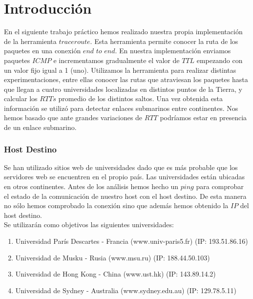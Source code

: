 \section{Introducción}

En el siguiente trabajo práctico hemos realizado nuestra propia implementación de la herramienta $traceroute$.
Esta herramienta permite conocer la ruta de los paquetes en una conexión $end$ $to$ $end$. 
En nuestra implementación enviamos paquetes $ICMP$ e incrementamos gradualmente el valor de $TTL$ empezando con un valor fijo igual a 1 (uno). 
Utilizamos la herramienta para realizar distintas experimentaciones, entre ellas conocer las rutas que atraviesan los paquetes hasta que 
llegan a cuatro universidades localizadas en distintos puntos de la Tierra, y calcular los $RTTs$ promedio de los distintos saltos.
Una vez obtenida esta información se utilizó para detectar enlaces submarinos entre continentes. Nos hemos basado que ante grandes variaciones
de $RTT$ podríamos estar en presencia de un enlace submarino.

\subsubsection{Host Destino}
Se han utilizado sitios web de universidades dado que es más probable que los servidores web se encuentren en el propio país.
Las universidades están ubicadas en otros continentes. Antes de los análisis hemos hecho un $ping$ para comprobar 
el estado de la comunicación de nuestro host con el host destino. De esta manera no sólo hemos comprobado la conexión sino que además hemos obtenido 
la $IP$ del host destino.\\

Se utilizarán como objetivos las siguientes universidades:
\begin{enumerate}
\item Universidad París Descartes - Francia (www.univ-paris5.fr) (IP: 193.51.86.16)
\item Universidad de Musku - Rusia (www.msu.ru) (IP: 188.44.50.103)
\item Universidad de Hong Kong - China (www.ust.hk) (IP: 143.89.14.2)
\item Universidad de Sydney - Australia (www.sydney.edu.au) (IP: 129.78.5.11)
\end{enumerate}



